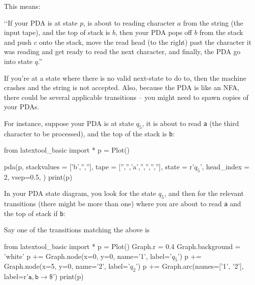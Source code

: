 This means:
\begin{tightlist}
  \item []
  \lq\lq If your PDA is at state $p$, is about to reading character $a$ from the string
  (the input tape), and the top of stack is $b$, then your PDA  pops off
  $b$ from the stack and push $c$ onto the stack,
  move the read head (to the right) past 
  the character it was reading and 
  get ready to read the next character,
  and finally, the PDA go into state $q$.''
\end{tightlist}
If you're at a state where there is no valid next-state to do to,
then the machine crashes and the string is not accepted.
Also, because the PDA is like an NFA, there could be several
applicable transitions -- you might need to spawn copies of your PDAs.

For instance, suppose your PDA is at state $q_5$, it is
about to read \verb!a! (the third character to be processed),
and
the top of the stack is
\verb!b!:

\begin{python}
from latextool_basic import *
p = Plot()

pda(p,
    stackvalues = ['b','',''],
    tape = ['','','a','','','',''],
    state = r'$q_5$',
    head_index = 2,
    vsep=0.5,
    )
print(p)
\end{python}

In your PDA state diagram,
you look for the state $q_5$, and then 
for the relevant transitions (there might be more than one)
where you are about to read \verb!a! and the top of stack if
\verb!b!:


Say one of the transitions matching the above is 

\begin{python}
from latextool_basic import *
p = Plot()
Graph.r = 0.4
Graph.background = 'white'
p += Graph.node(x=0, y=0, name='1', label='$q_5$')
p += Graph.node(x=5, y=0, name='2', label='$q_2$')
p += Graph.arc(names=['1', '2'], label=r'$\texttt{a}, \texttt{b} \rightarrow \texttt{\$} $')
print(p)
\end{python}

